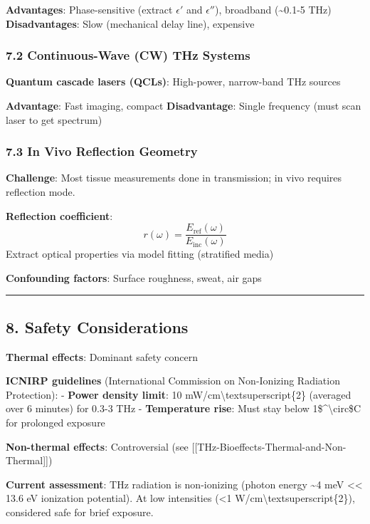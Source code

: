 \textbf{Advantages}: Phase-sensitive (extract \(\epsilon'\) and
\(\epsilon''\)), broadband (\textasciitilde0.1-5 THz)
\textbf{Disadvantages}: Slow (mechanical delay line), expensive

\subsubsection{7.2 Continuous-Wave (CW) THz
Systems}\label{continuous-wave-cw-thz-systems}

\textbf{Quantum cascade lasers (QCLs)}: High-power, narrow-band THz
sources

\textbf{Advantage}: Fast imaging, compact \textbf{Disadvantage}: Single
frequency (must scan laser to get spectrum)

\subsubsection{7.3 In Vivo Reflection
Geometry}\label{in-vivo-reflection-geometry}

\textbf{Challenge}: Most tissue measurements done in transmission; in
vivo requires reflection mode.

\textbf{Reflection coefficient}:
\[r(\omega) = \frac{E_{\text{ref}}(\omega)}{E_{\text{inc}}(\omega)}\]
Extract optical properties via model fitting (stratified media)

\textbf{Confounding factors}: Surface roughness, sweat, air gaps

\begin{center}\rule{0.5\linewidth}{0.5pt}\end{center}

\subsection{8. Safety Considerations}\label{safety-considerations}

\textbf{Thermal effects}: Dominant safety concern

\textbf{ICNIRP guidelines} (International Commission on Non-Ionizing
Radiation Protection): - \textbf{Power density limit}: 10
mW/cm\textbackslash textsuperscript\{2\} (averaged over 6 minutes) for
0.3-3 THz - \textbf{Temperature rise}: Must stay below
1\$\^{}\textbackslash circ\$C for prolonged exposure

\textbf{Non-thermal effects}: Controversial (see
{[}{[}THz-Bioeffects-Thermal-and-Non-Thermal{]}{]})

\textbf{Current assessment}: THz radiation is non-ionizing (photon
energy \textasciitilde4 meV \textless\textless{} 13.6 eV ionization
potential). At low intensities (\textless1
W/cm\textbackslash textsuperscript\{2\}), considered safe for brief
exposure.

